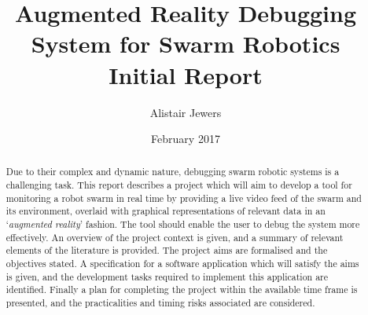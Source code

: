 \documentclass[hidelinks,10pt]{article}
\date{February 2017}
\title{Augmented Reality Debugging System for Swarm Robotics \vspace{1cm}\\\Large{Initial Report}}
\author{Alistair Jewers}
\begin{document}
\begin{titlingpage}
	\maketitle
	\vspace{5cm}
	\begin{abstract}
	Due to their complex and dynamic nature, debugging swarm robotic systems is a challenging task. This report describes a project which will aim to develop a tool for monitoring a robot swarm in real time by providing a live video feed of the swarm and its environment, overlaid with graphical representations of relevant data in an `\textit{augmented reality}' fashion. The tool should enable the user to debug the system more effectively. An overview of the project context is given, and a summary of relevant elements of the literature is provided. The project aims are formalised and the objectives stated. A specification for a software application which will satisfy the aims is given, and the development tasks required to implement this application are identified. Finally a plan for completing the project within the available time frame is presented, and the practicalities and timing risks associated are considered.
	\end{abstract}
\end{titlingpage}

\tableofcontents
\newpage
\end{document}
